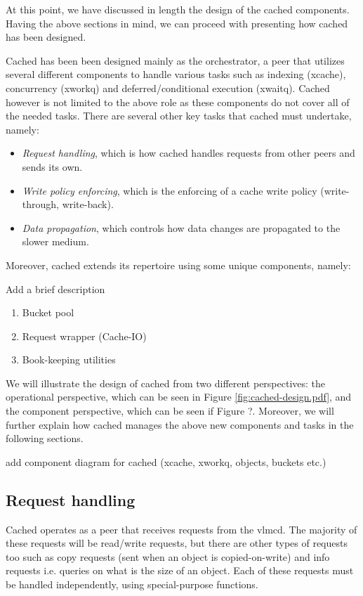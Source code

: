 At this point, we have discussed in length the design of the cached components.  
Having the above sections in mind, we can proceed with presenting how cached 
has been designed.

Cached has been been designed mainly as the orchestrator, a peer that utilizes 
several different components to handle various tasks such as indexing (xcache), 
concurrency (xworkq) and deferred/conditional execution (xwaitq). Cached 
however is not limited to the above role as these components do not cover all 
of the needed tasks. There are several other key tasks that cached must 
undertake, namely:

\begin{itemize}
	\item \textit{Request handling}, which is how cached handles requests 
		from other peers and sends its own.
	\item \textit{Write policy enforcing}, which is the enforcing of a 
		cache write policy (write-through, write-back).
	\item \textit{Data propagation}, which controls how data changes are 
		propagated to the slower medium.
\end{itemize}

Moreover, cached extends its repertoire using some unique components, namely:

\fixme Add a brief description
\begin{enumerate}
	\item Bucket pool
	\item Request wrapper (Cache-IO)
	\item Book-keeping utilities
\end{enumerate}

We will illustrate the design of cached from two different perspectives: the 
operational perspective, which can be seen in Figure 
\ref{fig:cached-design.pdf}, and the component perspective, which can be seen 
if Figure ?. Moreover, we will further explain how cached manages the above new 
components and tasks in the following sections.

\fixme add component diagram for cached (xcache, xworkq, objects, buckets etc.)

\subsection{Request handling}

Cached operates as a peer that receives requests from the vlmcd. The majority of 
these requests will be read/write requests, but there are other types of 
requests too such as copy requests (sent when an object is copied-on-write) and 
info requests i.e. queries on what is the size of an object. Each of these 
requests must be handled independently, using special-purpose functions.

